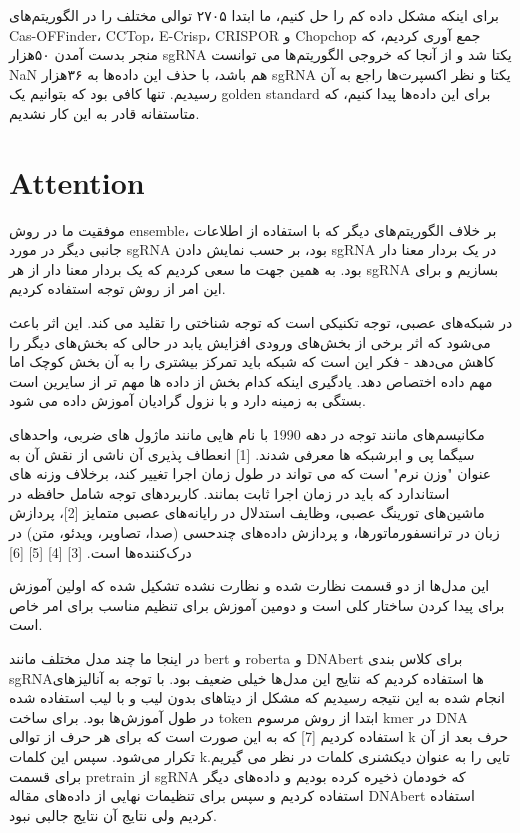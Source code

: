 \documentclass[12pt,a4paper,BCOR=.7cm,headsepline,bibliography=totoc]{report}
\begin{document}
برای اینکه مشکل داده کم را حل کنیم، ما ابتدا ۲۷۰۵ توالی مختلف را در الگوریتم‌های Cas-OFFinder، CCTop، E-Crisp، CRISPOR و Chopchop جمع آوری کردیم، که منجر بدست آمدن ۵۰هزار sgRNA یکتا شد و از آنجا که خروجی الگوریتم‌ها می توانست NaN هم باشد، با حذف این داده‌ها به ۳۶هزار sgRNA یکتا و نظر اکسپرت‌ها راجع به آن رسیدیم. تنها کافی بود که بتوانیم یک golden standard برای این داده‌ها پیدا کنیم، که متاستفانه قادر به این کار نشدیم.

\section{Attention}
موفقیت ما در روش ensemble، بر خلاف الگوریتم‌های دیگر که با استفاده از اطلاعات جانبی دیگر در مورد sgRNA بود، بر حسب نمایش دادن sgRNA در یک بردار معنا دار بود. به همین جهت ما سعی کردیم که یک بردار معنا دار از هر ‌sgRNA بسازیم و برای این امر از روش توجه استفاده کردیم.

در شبکه‌های عصبی، توجه تکنیکی است که توجه شناختی را تقلید می کند. این اثر باعث می‌شود که اثر برخی از بخش‌های ورودی افزایش یابد در حالی که بخش‌های دیگر را کاهش می‌دهد - فکر این است که شبکه باید تمرکز بیشتری را به آن بخش کوچک اما مهم داده اختصاص دهد. یادگیری اینکه کدام بخش از داده ها مهم تر از سایرین است بستگی به زمینه دارد و با نزول گرادیان آموزش داده می شود.

مکانیسم‌های مانند توجه در دهه 1990 با نام هایی مانند ماژول های ضربی، واحدهای سیگما پی و ابرشبکه ها معرفی شدند. [1] انعطاف پذیری آن ناشی از نقش آن به عنوان "وزن نرم" است که می تواند در طول زمان اجرا تغییر کند، برخلاف وزنه های استاندارد که باید در زمان اجرا ثابت بمانند. کاربردهای توجه شامل حافظه در ماشین‌های تورینگ عصبی، وظایف استدلال در رایانه‌های عصبی متمایز [2]، پردازش زبان در ترانسفورماتورها، و پردازش داده‌های چندحسی (صدا، تصاویر، ویدئو، متن) در درک‌کننده‌ها است. [3] [4] [5] [6]

این مدل‌ها از دو قسمت نظارت شده و  نظارت نشده تشکیل شده که اولین آموزش برای پیدا کردن ساختار کلی است و دومین آموزش برای تنظیم مناسب برای امر خاص است.

در اینجا ما چند مدل مختلف مانند bert و roberta و DNAbert برای کلاس بندی sgRNAها استفاده کردیم که نتایج این مدل‌ها خیلی ضعیف بود. با توجه به آنالیزهای انجام شده به این نتیجه رسیدیم که مشکل از دیتاهای بدون لیب و با لیب استفاده شده در طول آموزش‌ها بود. برای ساخت token ابتدا از روش مرسوم kmer در DNA استفاده کردیم [7] که به این صورت است که برای هر حرف از توالی k حرف بعد از آن تکرار می‌شود. سپس این کلمات kتایی را به عنوان دیکشنری کلمات در نظر می گیریم. برای قسمت pretrain از sgRNA که خودمان ذخیره کرده بودیم و داده‌های دیگر استفاده کردیم و سپس برای تنظیمات نهایی از داده‌های مقاله DNAbert استفاده کردیم ولی نتایج آن نتایج جالبی نبود.
\end{document}
